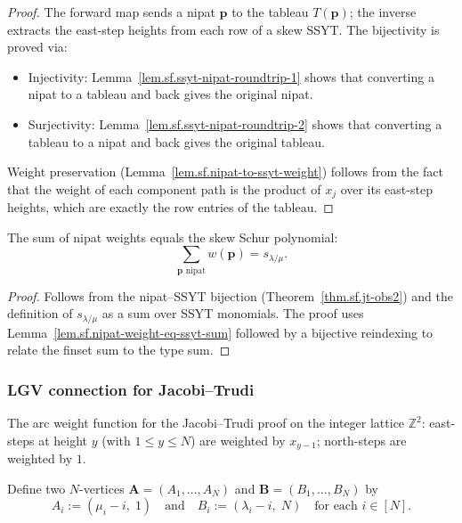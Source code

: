 \begin{proof}
\leanok
The forward map sends a nipat $\mathbf{p}$ to the tableau $T(\mathbf{p})$;
the inverse extracts the east-step heights from each row of a skew SSYT.
The bijectivity is proved via:
\begin{itemize}
\item Injectivity: Lemma~\ref{lem.sf.ssyt-nipat-roundtrip-1} shows
that converting a nipat to a tableau and back gives the original nipat.
\item Surjectivity: Lemma~\ref{lem.sf.ssyt-nipat-roundtrip-2} shows
that converting a tableau to a nipat and back gives the original tableau.
\end{itemize}
Weight preservation (Lemma~\ref{lem.sf.nipat-to-ssyt-weight}) follows from the
fact that the weight of each component path is the product of $x_j$
over its east-step heights, which are exactly the row entries of the tableau.
\end{proof}

\begin{lemma}
\label{lem.sf.nipat-weight-eq-skew-schur}
\leanhelper
\leanok
The sum of nipat weights equals the skew Schur polynomial:
\[
\sum_{\mathbf{p} \text{ nipat}} w(\mathbf{p}) = s_{\lambda/\mu}.
\]
\end{lemma}

\begin{proof}
\leanok
Follows from the nipat--SSYT bijection (Theorem~\ref{thm.sf.jt-obs2})
and the definition of $s_{\lambda/\mu}$ as a sum over SSYT monomials.
The proof uses Lemma~\ref{lem.sf.nipat-weight-eq-ssyt-sum} followed by
a bijective reindexing to relate the finset sum to the type sum.
\end{proof}

\subsubsection{LGV connection for Jacobi--Trudi}

\begin{definition}
\label{def.sf.jt-arc-weight}
\leanhelper
\leanok
The arc weight function for the Jacobi--Trudi proof on the integer lattice
$\mathbb{Z}^2$: east-steps at height $y$ (with $1 \leq y \leq N$) are
weighted by $x_{y-1}$; north-steps are weighted by $1$.
\end{definition}

\begin{definition}
\label{def.sf.jt-source-target}
\leanhelper
\leanok
Define two $N$-vertices
$\mathbf{A} = (A_1, \ldots, A_N)$ and $\mathbf{B} = (B_1, \ldots, B_N)$
by
\[
A_i := (\mu_i - i,\; 1) \quad \text{and} \quad B_i := (\lambda_i - i,\; N)
\quad \text{for each } i \in [N].
\]
\end{definition}

